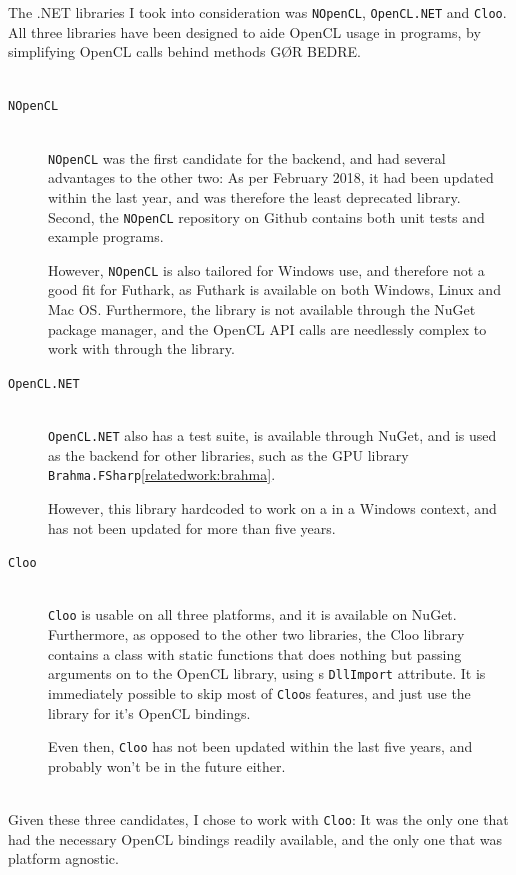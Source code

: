 \begin{description}
The .NET libraries I took into consideration was \texttt{NOpenCL}, \texttt{OpenCL.NET} and \texttt{Cloo}.
All three libraries have been designed to aide OpenCL usage in \csharp{}
programs, by simplifying OpenCL calls behind methods GØR BEDRE.
\\
\\
\begin{description}
\item[\texttt{NOpenCL}]\hfill\\
\texttt{NOpenCL} was the first candidate for the \csharp{} backend, and had
several advantages to the other two: As per February 2018, it had been updated
within the last year, and was therefore the least deprecated library. Second,
the \texttt{NOpenCL} repository on Github contains both unit tests and
example programs.

However, \texttt{NOpenCL} is also tailored for Windows use, and therefore not a
good fit for Futhark, as Futhark is available on both Windows, Linux and Mac OS.
Furthermore, the library is not available through the NuGet
package manager, and the OpenCL API calls are needlessly complex to work with
through the library.

\item[\texttt{OpenCL.NET}]\hfill\\
\texttt{OpenCL.NET} also has a test suite, is available through NuGet, and is
used as the backend for other libraries, such as the \fsharp{} GPU library
\texttt{Brahma.FSharp}\ref{relatedwork:brahma}.

However, this library hardcoded to work on a in a Windows context, and has not been
updated for more than five years.

\item[\texttt{Cloo}]\hfill\\
\texttt{Cloo} is usable on all three
platforms, and it is available on NuGet. Furthermore, as opposed to the other two libraries, the
Cloo library contains a class with static functions that does nothing but
passing arguments on to the OpenCL library, using \csharp{}s \texttt{DllImport}
attribute. It is immediately possible to skip most of \texttt{Cloo}s features,
and just use the library for it's OpenCL bindings.

Even then, \texttt{Cloo} has not been updated within the last five years, and
probably won't be in the future either.
\\
\\
\end{description}
Given these three candidates, I chose to work with \texttt{Cloo}: It was the
only one that had the necessary OpenCL bindings readily available, and the only
one that was platform agnostic.


\end{description}
